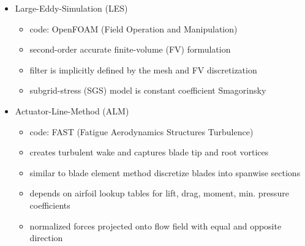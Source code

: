 \documentclass[xcolor=x11names,compress]{beamer}
\renewcommand{\(}{\begin{columns}}
\renewcommand{\)}{\end{columns}}
\newcommand{\<}[1]{\begin{column}{#1}}
\renewcommand{\>}{\end{column}}
\begin{document}
\begin{frame}{}
\begin{columns}
\begin{column}{0.875\textwidth}
		\begin{itemize}
			\item \small Large-Eddy-Simulation (LES)
			\vspace{-5pt}
				\begin{itemize}
					\item \small code: OpenFOAM (\scriptsize{Field Operation and Manipulation})
					\item second-order accurate finite-volume (FV) formulation 
					\item filter is implicitly defined by the mesh and FV discretization
					\item subgrid-stress (SGS) model is constant coefficient Smagorinsky
				\end{itemize}

			\item Actuator-Line-Method (ALM)
			\vspace{-5pt}
				\begin{itemize}
					\item \small code: FAST (\scriptsize{Fatigue Aerodynamics Structures Turbulence})
					\item creates turbulent wake and captures blade tip and root vortices
					\item similar to blade element method discretize blades into spanwise sections
					\item depends on airfoil lookup tables for lift, drag, moment, min. pressure coefficients
					\item normalized forces projected onto flow field with equal and opposite direction
				\end{itemize}

		\end{itemize}
    
    \end{column}

\end{columns}



\end{frame}



\end{document}
